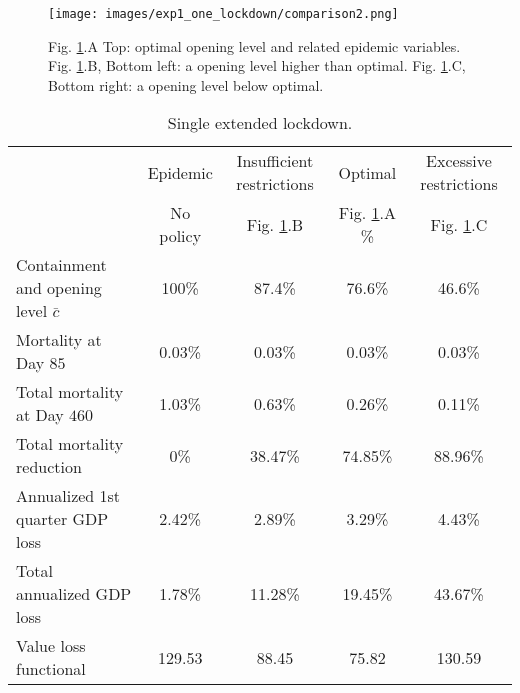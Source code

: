 \documentclass{amsart}
\begin{document}
\begin{figure}[h!]
    \centering
    \texttt{[image: images/exp1\_one\_lockdown/comparison2.png]}
    \caption{Fig. \ref{comparison2_experiment1}.A Top: optimal opening level and related epidemic variables. Fig. \ref{comparison2_experiment1}.B, Bottom left: a opening level higher than optimal. Fig.
    \ref{comparison2_experiment1}.C, Bottom right: a opening
    level below optimal.}
    \label{comparison2_experiment1}
\end{figure}

\begin{table}[htbp]
  \centering
  \caption{Single extended lockdown.
  }
  
    \begin{tabular}{lcccc}
     
 & \multicolumn{1}{c}{Epidemic} & \multicolumn{1}{c}{ 
        Insufficient restrictions} & \multicolumn{1}{c}{Optimal}& \multicolumn{1}{c}{Excessive restrictions} \\    & \multicolumn{1}{c}{No policy } & \multicolumn{1}{c}{ 
        Fig. \ref{comparison2_experiment1}.B } & \multicolumn{1}{c}{Fig. \ref{comparison2_experiment1}.A \%} & \multicolumn{1}{c}{Fig. \ref{comparison2_experiment1}.C } \\ \hline \vspace{0.1cm}
     Containment and opening level $\bar{c}$ & 100\% & 87.4\% & 76.6\% & 46.6\% \\  \vspace{0.1cm}    
   Mortality at Day $85$ & 0.03\%  & 0.03\%  & 0.03\%  & 0.03\% \\ \vspace{0.1cm}
    Total mortality at Day $460$ & 1.03\%  & 0.63\%  & 0.26\%  & 0.11\% \\  \vspace{0.1cm}
    Total mortality reduction & 0\%   & 38.47\% & 74.85\% & 88.96\% \\ \vspace{0.1cm}
    Annualized 1st quarter GDP loss   & 2.42\%  & 2.89\%  & 3.29\%  & 4.43\% \\ \vspace{0.1cm}
    Total annualized GDP loss  & 1.78\% & 11.28\%  & 19.45\% & 43.67\% \\ \vspace{0.1cm}
    Value loss functional & 129.53 & 88.45 & 75.82 & 130.59\\ \hline 
    
    \end{tabular}%
  \label{tab:onlylockdown}%
\end{table}%
\end{document}
